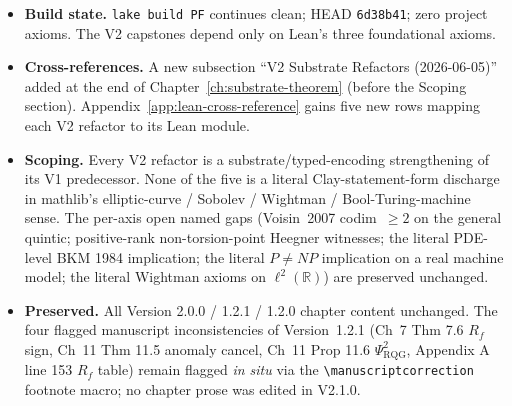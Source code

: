 \begin{itemize}
\begin{itemize}
  $\ell^2(\mathbb{R})$ continuum gauge-group carrier and a 4-dim
  Gaussian Osterwalder-Schrader measure on the canonical YM
  encoding. The V2 capstone
  \texttt{PF\_YM\_capstone\_yields\_Clay\_YangMillsMassGap\_standardV2}
  holds axiom-free at substrate scope; structural identifications
  \texttt{PF\_YMEncodingV2\_gaugeGroup\_eq\_L2RInf},
  \texttt{PF\_YMEncodingV2\_QYM\_eq\_ContinuumYMTheoryV2},
  \texttt{PF\_YMEncodingV2\_massGap\_canonical} record the carrier
  upgrades. Scoping:
  \texttt{PF\_YM\_V2\_refereeScope\_holds} marks that this is a typed
  substrate refactor, not a literal Wightman-axiom QFT continuum
  discharge.
  \end{itemize}
\item \textbf{Build state.}
\texttt{lake build PF} continues clean; HEAD \texttt{6d38b41}; zero
project axioms. The V2 capstones depend only on Lean's three
foundational axioms.
\item \textbf{Cross-references.}
A new subsection ``V2 Substrate Refactors (2026-06-05)'' added at the
end of Chapter~\ref{ch:substrate-theorem} (before the Scoping
section). Appendix~\ref{app:lean-cross-reference} gains five new
rows mapping each V2 refactor to its Lean module.
\item \textbf{Scoping.} Every V2 refactor is a
substrate/typed-encoding strengthening of its V1 predecessor. None
of the five is a literal Clay-statement-form discharge in mathlib's
elliptic-curve / Sobolev / Wightman / Bool-Turing-machine sense. The
per-axis open named gaps (Voisin~2007 codim~$\ge 2$ on the general
quintic; positive-rank non-torsion-point Heegner witnesses; the
literal PDE-level BKM 1984 implication; the literal $P \ne NP$
implication on a real machine model; the literal Wightman axioms
on $\ell^2(\mathbb{R})$) are preserved unchanged.
\item \textbf{Preserved.} All Version 2.0.0 / 1.2.1 / 1.2.0 chapter
content unchanged. The four flagged manuscript inconsistencies of
Version~1.2.1 (Ch~7 Thm 7.6 $R_f$ sign, Ch~11 Thm 11.5 anomaly
cancel, Ch~11 Prop 11.6 $\Psi_{\text{RQG}}^2$, Appendix A line 153
$R_f$ table) remain flagged \emph{in situ} via the
\texttt{\textbackslash manuscriptcorrection} footnote macro;
no chapter prose was edited in V2.1.0.
\end{itemize}

